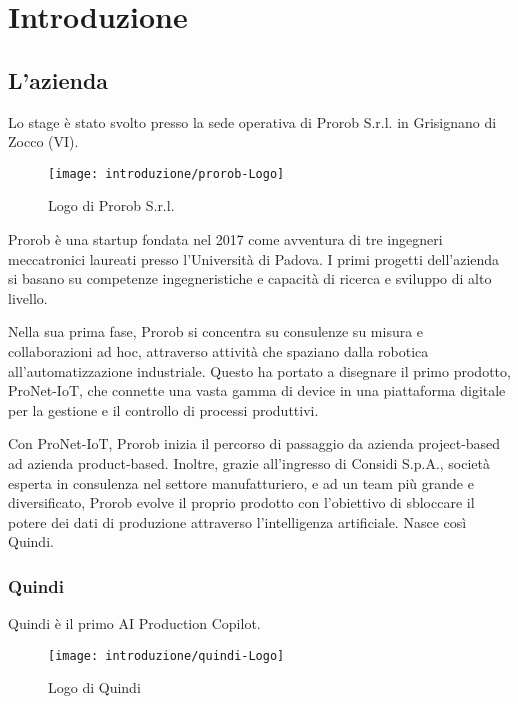 \chapter{Introduzione}
\label{cap:introduzione}


\section{L'azienda}

Lo stage è stato svolto presso la sede operativa di Prorob S.r.l. in Grisignano di Zocco (VI).

\begin{figure}[!ht] 
    \centering 
    \texttt{[image: introduzione/prorob-Logo]} 
    \caption{Logo di Prorob S.r.l.}
\end{figure}

Prorob è una startup fondata nel 2017 come avventura di tre ingegneri meccatronici laureati presso l'Università di Padova.
I primi progetti dell'azienda si basano su competenze ingegneristiche e capacità di ricerca e sviluppo di alto livello.

Nella sua prima fase, Prorob si concentra su consulenze su misura e collaborazioni ad hoc, attraverso attività che spaziano dalla robotica all'automatizzazione industriale.
Questo ha portato a disegnare il primo prodotto, ProNet-IoT, che connette una vasta gamma di device in una piattaforma digitale per la gestione e il controllo di processi produttivi.

Con ProNet-IoT, Prorob inizia il percorso di passaggio da azienda project-based ad azienda product-based.
Inoltre, grazie all'ingresso di Considi S.p.A., società esperta in consulenza nel settore manufatturiero, e ad un team più grande e diversificato, Prorob evolve il proprio prodotto con l'obiettivo di sbloccare il potere dei dati di produzione attraverso l'intelligenza artificiale. Nasce così Quindi.

\bigskip
\vfill
\hfill

\subsection{Quindi}
Quindi è il primo AI Production Copilot.

\begin{figure}[!ht] 
    \centering 
    \texttt{[image: introduzione/quindi-Logo]} 
    \caption{Logo di Quindi}
\end{figure}

